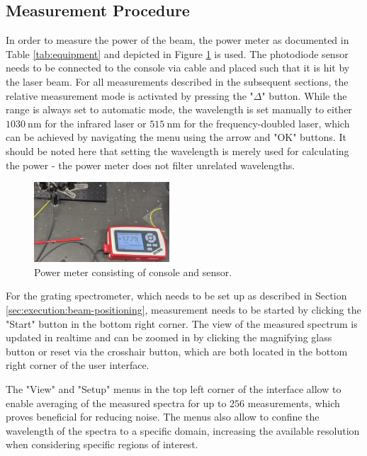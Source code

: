 \subsection{Measurement Procedure}
\label{sec:execution:measurement-procedure}

In order to measure the power of the beam, the power meter as documented in Table \ref{tab:equipment} and depicted in Figure \ref{fig:execution:aperture} is used. The photodiode sensor needs to be connected to the console via cable and placed such that it is hit by the laser beam. For all measurements described in the subsequent sections, the relative measurement mode is activated by pressing the "$\Delta$" button. While the range is always set to automatic mode, the wavelength is set manually to either $\SI{1030}{\nm}$ for the infrared laser or $\SI{515}{\nm}$ for the frequency-doubled laser, which can be achieved by navigating the menu using the arrow and "OK" buttons. It should be noted here that setting the wavelength is merely used for calculating the power - the power meter does not filter unrelated wavelengths.

\begin{figure}[H]
    \centering
    \includegraphics[width=0.45\textwidth]{graphics/power-meter.png}
    \caption{Power meter consisting of console and sensor.}
    \label{fig:execution:aperture}
\end{figure}

For the grating spectrometer, which needs to be set up as described in Section \ref{sec:execution:beam-positioning}, measurement needs to be started by clicking the "Start" button in the bottom right corner. The view of the measured spectrum is updated in realtime and can be zoomed in by clicking the magnifying glass button or reset via the crosshair button, which are both located in the bottom right corner of the user interface.

The "View" and "Setup" menus in the top left corner of the interface allow to enable averaging of the measured spectra for up to $256$ measurements, which proves beneficial for reducing noise. The menus also allow to confine the wavelength of the spectra to a specific domain, increasing the available resolution when considering specific regions of interest.

